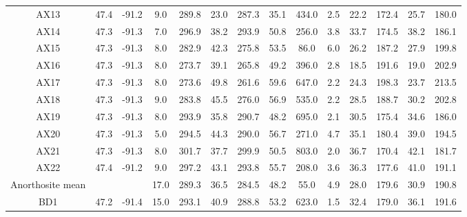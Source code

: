 \begin{table}
\begin{tabular}{cccccccccccccc}
AX13             & 47.4 & -91.2 & 9.0  & 289.8   & 23.0         & 287.3   & 35.1    & 434.0 & 2.5                     & 22.2        & 172.4       & 25.7         & 180.0        \\
AX14             & 47.3 & -91.3 & 7.0  & 296.9   & 38.2         & 293.9   & 50.8    & 256.0 & 3.8                     & 33.7        & 174.5       & 38.2         & 186.1        \\
AX15             & 47.3 & -91.3 & 8.0  & 282.9   & 42.3         & 275.8   & 53.5    & 86.0  & 6.0                     & 26.2        & 187.2       & 27.9         & 199.8        \\
AX16             & 47.3 & -91.3 & 8.0  & 273.7   & 39.1         & 265.8   & 49.2    & 396.0 & 2.8                     & 18.5        & 191.6       & 19.0         & 202.9        \\
AX17             & 47.3 & -91.3 & 8.0  & 273.6   & 49.8         & 261.6   & 59.6    & 647.0 & 2.2                     & 24.3        & 198.3       & 23.7         & 213.5        \\
AX18             & 47.3 & -91.3 & 9.0  & 283.8   & 45.5         & 276.0   & 56.9    & 535.0 & 2.2                     & 28.5        & 188.7       & 30.2         & 202.8        \\
AX19             & 47.3 & -91.3 & 8.0  & 293.9   & 35.8         & 290.7   & 48.2    & 695.0 & 2.1                     & 30.5        & 175.4       & 34.6         & 186.0        \\
AX20             & 47.3 & -91.3 & 5.0  & 294.5   & 44.3         & 290.0   & 56.7    & 271.0 & 4.7                     & 35.1        & 180.4       & 39.0         & 194.5        \\
AX21             & 47.3 & -91.3 & 8.0  & 301.7   & 37.7         & 299.9   & 50.5    & 803.0 & 2.0                     & 36.7        & 170.4       & 42.1         & 181.7        \\
AX22             & 47.4 & -91.2 & 9.0  & 297.2   & 43.1         & 293.8   & 55.7    & 208.0 & 3.6                     & 36.3        & 177.6       & 41.0         & 191.1        \\
\hline
Anorthosite mean &      &       & 17.0 & 289.3   & 36.5         & 284.5   & 48.2    & 55.0  & 4.9                     & 28.0        & 179.6       & 30.9         & 190.8        \\
\hline
BD1              & 47.2 & -91.4 & 15.0 & 293.1   & 40.9         & 288.8   & 53.2    & 623.0 & 1.5                     & 32.4        & 179.0       & 36.1         & 191.6        \\

\end{tabular}
\end{table}
